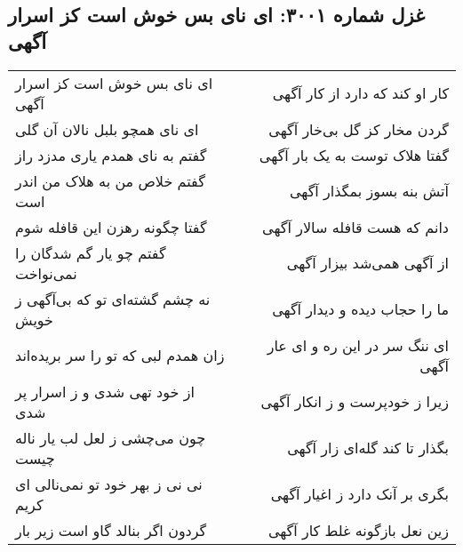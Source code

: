 \begin{center}
\section*{غزل شماره ۳۰۰۱: ای نای بس خوش است کز اسرار آگهی}
\label{sec:3001}
\begin{longtable}{l p{0.5cm} r}
ای نای بس خوش است کز اسرار آگهی
&&
کار او کند که دارد از کار آگهی
\\
ای نای همچو بلبل نالان آن گلی
&&
گردن مخار کز گل بی‌خار آگهی
\\
گفتم به نای همدم یاری مدزد راز
&&
گفتا هلاک توست به یک بار آگهی
\\
گفتم خلاص من به هلاک من اندر است
&&
آتش بنه بسوز بمگذار آگهی
\\
گفتا چگونه رهزن این قافله شوم
&&
دانم که هست قافله سالار آگهی
\\
گفتم چو یار گم شدگان را نمی‌نواخت
&&
از آگهی همی‌شد بیزار آگهی
\\
نه چشم گشته‌ای تو که بی‌آگهی ز خویش
&&
ما را حجاب دیده و دیدار آگهی
\\
زان همدم لبی که تو را سر بریده‌اند
&&
ای ننگ سر در این ره و ای عار آگهی
\\
از خود تهی شدی و ز اسرار پر شدی
&&
زیرا ز خودپرست و ز انکار آگهی
\\
چون می‌چشی ز لعل لب یار ناله چیست
&&
بگذار تا کند گله‌ای زار آگهی
\\
نی نی ز بهر خود تو نمی‌نالی ای کریم
&&
بگری بر آنک دارد ز اغیار آگهی
\\
گردون اگر بنالد گاو است زیر بار
&&
زین نعل بازگونه غلط کار آگهی
\\
\end{longtable}
\end{center}
